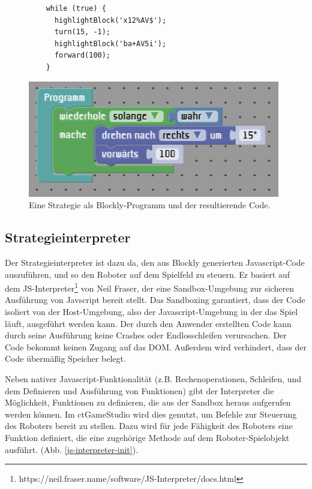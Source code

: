 \begin{figure}
  \begin{lstlisting}
    while (true) {
      highlightBlock('x12%AV$');
      turn(15, -1);
      highlightBlock('ba+AV5i');
      forward(100);
    }
  \end{lstlisting}

  \includegraphics{figures/code-generation-blockly.png}

  \caption{Eine Strategie als Blockly-Programm und der resultierende Code.}

  \label{code-generation}
\end{figure}


\subsection{Strategieinterpreter}

Der Strategieinterpreter ist dazu da, den aus Blockly generierten Javascript-Code auszuführen, und
so den Roboter auf dem Spielfeld zu steuern. Er basiert auf dem
JS-Interpreter\footnote{https://neil.fraser.name/software/JS-Interpreter/docs.html} von Neil Fraser,
der eine Sandbox-Umgebung zur sicheren Ausführung von Javscript bereit stellt. Das Sandboxing
garantiert, dass der Code isoliert von der Host-Umgebung, also der Javascript-Umgebung in der das
Spiel läuft, ausgeführt werden kann. Der durch den Anwender erstellten Code kann durch seine
Ausführung keine Crashes oder Endlosschleifen verursachen. Der Code bekommt keinen Zugang auf das
DOM. Außerdem wird verhindert, dass der Code übermäßig Speicher belegt.

Neben nativer Javascript-Funktionalität (z.B. Rechenoperationen, Schleifen, und dem Definieren und
Ausführung von Funktionen) gibt der Interpreter die Möglichkeit, Funktionen zu definieren, die aus
der Sandbox heraus aufgerufen werden können. Im ctGameStudio wird dies genutzt, um Befehle zur
Steuerung des Roboters bereit zu stellen. Dazu wird für jede Fähigkeit des Roboters eine Funktion
definiert, die eine zugehörige Methode auf dem Roboter-Spielobjekt ausführt. (Abb.
\ref{js-interpreter-init}).


